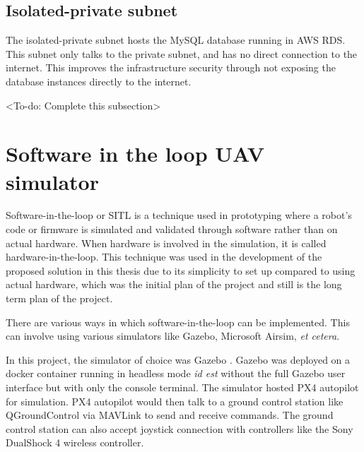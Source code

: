 


\subsection{Isolated-private subnet}
\label{isolated-private-subnet}

The isolated-private subnet hosts the MySQL database running in AWS RDS. This subnet only talks to the private subnet, and has no direct connection to the internet. This improves the infrastructure security through not exposing the database instances directly to the internet.

<To-do: Complete this subsection>




\section{Software in the loop UAV simulator}
\label{sec:software-in-the-loop}

Software-in-the-loop or SITL is a technique used in prototyping where a robot's code or firmware is simulated and validated through software rather than on actual hardware. When hardware is involved in the simulation, it is called hardware-in-the-loop. This technique was used in the development of the proposed solution in this thesis due to its simplicity to set up compared to using actual hardware, which was the initial plan of the project and still is the long term plan of the project.

There are various ways in which software-in-the-loop can be implemented. This can involve using various simulators like Gazebo, Microsoft Airsim, \textit{et cetera}.

In this project, the simulator of choice was Gazebo \cite{gazebosimulator}. Gazebo was deployed on a docker container running in headless mode \textit{id est} without the full Gazebo user interface but with only the console terminal. The simulator hosted PX4 autopilot for simulation. PX4 autopilot would then talk to a ground control station like QGroundControl via MAVLink to send and receive commands. The ground control station can also accept joystick connection with controllers like the Sony DualShock 4 wireless controller.

